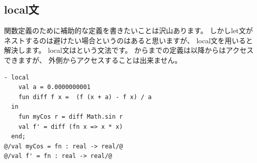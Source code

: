 \documentclass[11pt,a4paper]{jarticle}
\begin{document}
\subsection{local文}

関数定義のために補助的な定義を書きたいことは沢山あります。
しかしlet文がネストするのは避けたい場合というのはあると思いますが、
local文を用いると解決します。
local文はという文法です。
からまでの定義は以降からはアクセスできますが、
外側からアクセスすることは出来ません。

\begin{lstlisting}[caption=local文]
- local
    val a = 0.0000000001
    fun diff f x =  (f (x + a) - f x) / a
  in
    fun myCos r = diff Math.sin r
    val f' = diff (fn x => x * x)
  end;
@/val myCos = fn : real -> real/@
@/val f' = fn : real -> real/@
\end{lstlisting}





\end{document}
